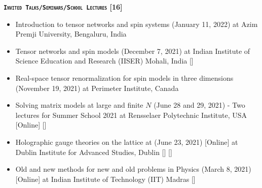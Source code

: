 \vspace{2mm} 
\textcolor{alizarin}{\textbf{\textsc{\fontsize{10}{38} \bfseries \texttt{Invited Talks/Seminars/School Lectures} [16]}}}

\begin{itemize}

 \item Introduction to tensor networks and spin systems 
 (January 11, 2022) at Azim Premji University, Bengaluru, India  \vspace{1mm} 
 \item Tensor networks and spin models 
 (December 7, 2021) at Indian Institute of Science Education and Research (IISER) Mohali, India 
 [\texttt{\textbf{}}]  \vspace{1mm} 
  \item Real-space tensor renormalization for spin models in three dimensions 
 (November 19, 2021) at Perimeter Institute, Canada \vspace{1mm}  
 \item Solving matrix models at large and finite $N$ (June 28 and 29, 2021) - Two lectures for 
Summer School 2021 at Rensselaer Polytechnic Institute, USA [Online]  
  [\texttt{\textbf{}}] \vspace{1mm} 
 
 
 \item Holographic gauge theories on the lattice at 
 (June 23, 2021) [Online] at Dublin Institute for Advanced Studies, Dublin
  [\texttt{\textbf{}}]  [\texttt{\textbf{}}] 
  \vspace{1mm} 
  
 \item Old and new methods for new and old problems in Physics
 (March 8, 2021) [Online] at Indian Institute of Technology (IIT) Madras
  [\texttt{\textbf{}}] 
\vspace{1mm} 
 

\end{itemize}

